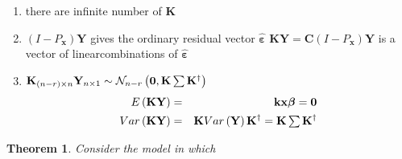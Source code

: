\documentclass{article}
\newtheorem{theorem}{Theorem}
\begin{document}
\begin{enumerate}
\item there are infinite number of $\mathbf{K}$

\item $\left( I-P_{\mathbf{x}}\right) \mathbf{Y}$ gives the ordinary
residual vector $\mathbf{\hat{\varepsilon}}$\newline
$\mathbf{KY}=\mathbf{C}\left( I-P_{\mathbf{x}}\right) \mathbf{Y}$ is a
vector of linearcombinations of $\mathbf{\hat{\varepsilon}}$

\item $\mathbf{K}_{\left( n-r\right) \times n}\mathbf{Y}_{n\times 1}\sim 
\mathcal{N}_{n-r}\left( \mathbf{0},\mathbf{K}\mathop{\textstyle \sum } \mathbf{K}^{\dagger
}\right) $%
\begin{eqnarray*}
E\left( \mathbf{KY}\right)  &=&\mathbf{kx\beta }=\mathbf{0} \\
Var\left( \mathbf{KY}\right)  &=&\mathbf{K}Var\left( \mathbf{Y}\right) 
\mathbf{K}^{\dagger }=\mathbf{K}\tsum \mathbf{K}^{\dagger }
\end{eqnarray*}
\end{enumerate}

\bigskip 

\begin{theorem}
Consider the model in which 
\end{theorem}
\end{document}
